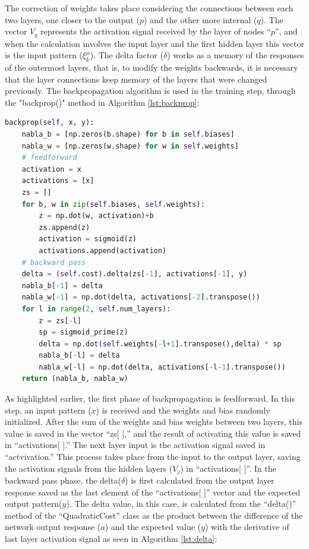 The correction of weights takes place considering the connections between each two layers, one closer to the output ($p$) and the other more internal ($q$). The vector $V_q$ represents the activation signal received by the layer of nodes “$p$”, and when the calculation involves the input layer and the first hidden layer this vector is the input pattern ($\xi_k^\mu$). The delta factor ($\delta$) works as a memory of the responses of the outermost layers, that is, to modify the weights backwards, it is necessary that the layer connections keep memory of the layers that were changed previously. The backpropagation algorithm is used in the training step, through the "backprop()" method in Algorithm \ref{lst:backprop}:

\begin{lstlisting}[caption={Backpropagation method in Python},label={lst:backprop},language=Python]
backprop(self, x, y):
    nabla_b = [np.zeros(b.shape) for b in self.biases]
    nabla_w = [np.zeros(w.shape) for w in self.weights]
    # feedforward
    activation = x
    activations = [x] 
    zs = [] 
    for b, w in zip(self.biases, self.weights):
        z = np.dot(w, activation)+b
        zs.append(z)
        activation = sigmoid(z)
        activations.append(activation)
    # backward pass
    delta = (self.cost).delta(zs[-1], activations[-1], y)
    nabla_b[-1] = delta
    nabla_w[-1] = np.dot(delta, activations[-2].transpose())
    for l in range(2, self.num_layers):
        z = zs[-l]
        sp = sigmoid_prime(z)
        delta = np.dot(self.weights[-l+1].transpose(),delta) * sp
        nabla_b[-l] = delta
        nabla_w[-l] = np.dot(delta, activations[-l-1].transpose())
    return (nabla_b, nabla_w)
\end{lstlisting}

As highlighted earlier, the first phase of backpropagation is feedforward. In this step, an input pattern ($x$) is received and the weights and bias randomly initialized. After the sum of the weights and bias weights between two layers, this value is saved in the vector “zs[ ],” and the result of activating this value is saved in “activations[ ].” The next layer input is the activation signal saved in “actvivation.” This process takes place from the input to the output layer, saving the activation signals from the hidden layers ($V_j$) in “activations[ ]”. In the backward pass phase, the delta($\delta$) is first calculated from the output layer response saved as the last element of the “activations[ ]” vector and the expected output pattern($y$). The delta value, in this case, is calculated from the “delta()” method of the “QuadraticCost” class as the product between the difference of the network output response ($a$) and the expected value ($y$) with the derivative of last layer activation signal as seen in Algorithm \ref{lst:delta}:

